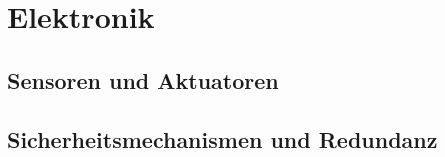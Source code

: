 

\chapter{Elektronik}
\label{chap:elektronik}


\section{Sensoren und Aktuatoren}
\section{Sicherheitsmechanismen und Redundanz }